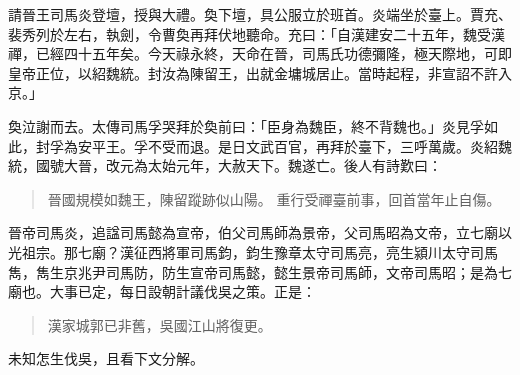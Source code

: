 請晉王司馬炎登壇，授與大禮。奐下壇，具公服立於班首。炎端坐於臺上。賈充、裴秀列於左右，執劍，令曹奐再拜伏地聽命。充曰：「自漢建安二十五年，魏受漢禪，已經四十五年矣。今天祿永終，天命在晉，司馬氏功德彌隆，極天際地，可即皇帝正位，以紹魏統。封汝為陳留王，出就金墉城居止。當時起程，非宣詔不許入京。」

奐泣謝而去。太傳司馬孚哭拜於奐前曰：「臣身為魏臣，終不背魏也。」炎見孚如此，封孚為安平王。孚不受而退。是日文武百官，再拜於臺下，三呼萬歲。炎紹魏統，國號大晉，改元為太始元年，大赦天下。魏遂亡。後人有詩歎曰：

\begin{quote}
晉國規模如魏王，陳留蹤跡似山陽。
重行受禪臺前事，回首當年止自傷。
\end{quote}

晉帝司馬炎，追諡司馬懿為宣帝，伯父司馬師為景帝，父司馬昭為文帝，立七廟以光祖宗。那七廟？漢征西將軍司馬鈞，鈞生豫章太守司馬亮，亮生潁川太守司馬雋，雋生京兆尹司馬防，防生宣帝司馬懿，懿生景帝司馬師，文帝司馬昭；是為七廟也。大事已定，每日設朝計議伐吳之策。正是：

\begin{quote}
漢家城郭已非舊，吳國江山將復更。
\end{quote}

未知怎生伐吳，且看下文分解。
